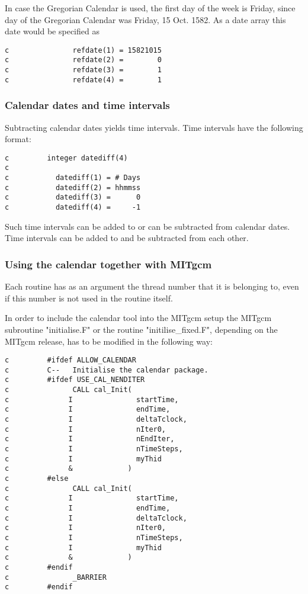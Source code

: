           In case the Gregorian Calendar is used, the first
          day of the week is Friday, since day of the Gregorian
          Calendar was Friday, 15 Oct. 1582. As a date array
          this date would be specified as

\begin{verbatim}
c               refdate(1) = 15821015
c               refdate(2) =        0
c               refdate(3) =        1
c               refdate(4) =        1
\end{verbatim}

\subsubsection{Calendar dates and time intervals}

    Subtracting calendar dates yields time intervals.
    Time intervals have the following format:

\begin{verbatim}
c         integer datediff(4)
c
c           datediff(1) = # Days
c           datediff(2) = hhmmss
c           datediff(3) =      0
c           datediff(4) =     -1
\end{verbatim}

    Such time intervals can be added to or can be subtracted from
    calendar dates. Time intervals can be added to and be
    subtracted from each other.

\subsubsection{Using the calendar together with MITgcm}

    Each routine has as an argument the thread number that it is
    belonging to, even if this number is not used in the routine
    itself.

    In order to include the calendar tool into the MITgcm
    setup the MITgcm subroutine "initialise.F" or the routine
    "initilise\_fixed.F", depending on the MITgcm release, has
    to be modified in the following way:

{\footnotesize
\begin{verbatim}
c         #ifdef ALLOW_CALENDAR
c         C--   Initialise the calendar package.
c         #ifdef USE_CAL_NENDITER
c               CALL cal_Init(
c              I               startTime,
c              I               endTime,
c              I               deltaTclock,
c              I               nIter0,
c              I               nEndIter,
c              I               nTimeSteps,
c              I               myThid
c              &             )
c         #else
c               CALL cal_Init(
c              I               startTime,
c              I               endTime,
c              I               deltaTclock,
c              I               nIter0,
c              I               nTimeSteps,
c              I               myThid
c              &             )
c         #endif
c               _BARRIER
c         #endif
\end{verbatim}
}

